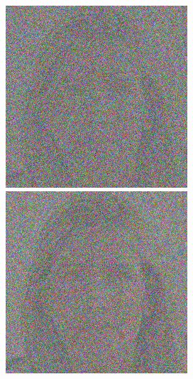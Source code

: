 \begin{figure}[H]
  \centering
  \begin{minipage}[b]{0.3\linewidth}
\includegraphics[width=\linewidth]{Picture/progress/box/x_0500.png}
  \end{minipage}
  \hspace{0.1cm} %
   \begin{minipage}[b]{0.3\linewidth}
    \includegraphics[width=\linewidth]{Picture/progress/box/x_0400.png}

\end{minipage}
\end{figure}
